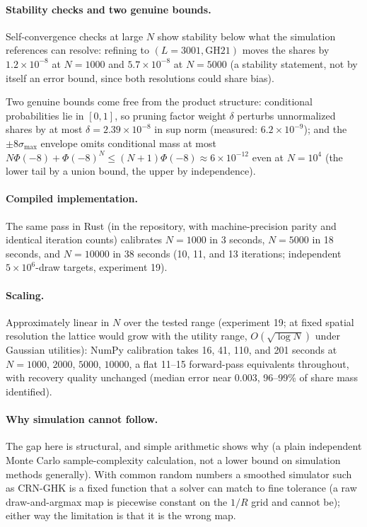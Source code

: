 \documentclass[12pt]{article}
\theoremstyle{remark}
\begin{document}
\paragraph{Stability checks and two genuine bounds.} Self-convergence
checks at large $N$ show stability below what the
simulation references can resolve: refining to $(L = 3001, \mathrm{GH}21)$
moves the shares by $1.2\times10^{-8}$ at $N=1000$ and
$5.7\times10^{-8}$ at $N=5000$ (a stability statement, not by itself an
error bound, since both resolutions could share bias).

Two genuine bounds
come free from the product structure: conditional probabilities lie in
$[0,1]$, so pruning factor weight $\delta$ perturbs unnormalized shares by
at most $\delta = 2.39\times10^{-8}$ in sup norm (measured:
$6.2\times10^{-9}$); and the $\pm8\sigma_{\max}$ envelope omits
conditional mass at most $N\Phi(-8) + \Phi(-8)^N \le (N+1)\Phi(-8)
\approx 6\times10^{-12}$ even at $N = 10^4$ (the lower tail by a union
bound, the upper by independence).

\paragraph{Compiled implementation.} The same pass in Rust (in the
repository, with machine-precision parity and identical iteration counts)
calibrates $N=1000$ in 3 seconds, $N=5000$ in 18 seconds, and
$N=10000$ in 38 seconds (10, 11, and 13 iterations; independent
$5\times10^6$-draw targets, experiment 19).

\paragraph{Scaling.} Approximately linear in $N$ over the tested range
(experiment
19; at fixed spatial resolution the lattice would grow with the utility
range, $O(\sqrt{\log N})$ under Gaussian utilities): NumPy calibration
takes 16, 41, 110, and 201 seconds at $N = 1000$, $2000$, $5000$,
$10000$, a
flat 11--15
forward-pass equivalents throughout, with recovery quality unchanged
(median error near $0.003$, 96--99\% of share mass identified).

\paragraph{Why simulation cannot follow.} The gap here is structural,
and simple arithmetic shows why
(a plain independent Monte Carlo sample-complexity calculation, not a
lower bound on simulation methods generally). With common random numbers a
smoothed simulator such as CRN-GHK is a fixed function that a solver can
match to fine tolerance (a raw draw-and-argmax map is piecewise constant on
the $1/R$ grid and cannot be); either way the limitation is that it is the
wrong map.
\end{document}
